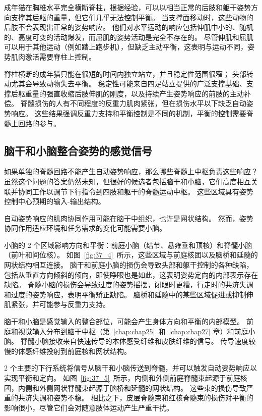 成年猫在胸椎水平完全横断脊柱，根据经验，可以以相当正常的后肢和躯干姿势方向支撑其后躯的重量，但它们几乎无法控制平衡。
当支撑面移动时，这些动物的后肢不会表现出正常的姿势响应。
他们对水平运动的响应包括伸肌中小的、随机的、高度可变的活动爆发，而屈肌的姿势活动是完全不存在的。
尽管伸肌和屈肌可以用于其他运动（例如踏上跑步机），但缺乏主动平衡，这表明与运动不同，姿势肌肉激活需要脊柱上控制。


脊柱横断的成年猫只能在很短的时间内独立站立，并且稳定性范围很窄；
头部转动尤其会导致动物失去平衡。
稳定性可能来自四足站立提供的广泛支撑基础、支撑后躯重量的强直收缩后肢伸肌的刚度，以及持续产生姿势响应的前肢的主动补偿。
脊髓损伤的人有不同程度的反重力肌肉紧张，但在损伤水平以下缺乏自动姿势响应。
这些结果强调反重力支持和平衡控制是不同的机制，平衡的控制需要脊髓上回路的参与。



\subsection{脑干和小脑整合姿势的感觉信号}

如果单独的脊髓回路不能产生自动姿势响应，那么哪些脊髓上中枢负责这些响应？
虽然这个问题的答案仍然未知，但很好的候选者包括脑干和小脑，它们高度相互关联并协同工作以调节下行指令到四肢和躯干的脊髓运动中枢。
这些区域具有姿势控制中心预期的输入-输出结构。


自动姿势响应的肌肉协同作用可能在脑干中组织，也许是网状结构。
然而，姿势协同作用适应环境和任务需求的变化可能需要小脑。


小脑的 2 个区域影响方向和平衡：前庭小脑（结节、悬雍垂和顶核）和脊髓小脑（前叶和间位核）。
如图~\ref{fig:37_4}~所示，这些区域与前庭核团以及脑桥和延髓的网状结构相互连接。
脑干和前庭小脑的损伤会导致头部和躯干控制的各种缺陷，包括从垂直方向倾斜的倾向，即使睁眼也是如此，这表明姿势定向的内部表示存在缺陷。
脊髓小脑的损伤会导致过度的姿势摇摆，闭眼时更糟，行走时的共济失调和过度的姿势响应，表明平衡矫正缺陷。
脑桥和延髓中的某些区域促进或抑制伸肌紧张，并可能参与反重力支持。


脑干和小脑是感觉输入的整合部位，可能会产生身体方向和平衡的内部模型。
前庭和视觉输入分布到脑干中枢（第~\ref{chap:chap25}~和~\ref{chap:chap27} 章）和前庭小脑。
脊髓小脑接收来自快速传导的本体感受纤维和皮肤纤维的信号。
传导速度较慢的体感纤维投射到前庭核和网状结构。


2 个主要的下行系统将信号从脑干和小脑传送到脊髓，并可以触发自动姿势响应以实现平衡和定向。
如图~\ref{fig:37_5}~所示，内侧和外侧前庭脊髓束起源于前庭核团，内侧和外侧网状脊髓束起源于脑桥和延髓的网状结构。
这些束的损伤导致严重的共济失调和姿势不稳。
相比之下，皮层脊髓束和红核脊髓束的损伤对平衡的影响很小，尽管它们会对随意肢体运动产生严重干扰。



